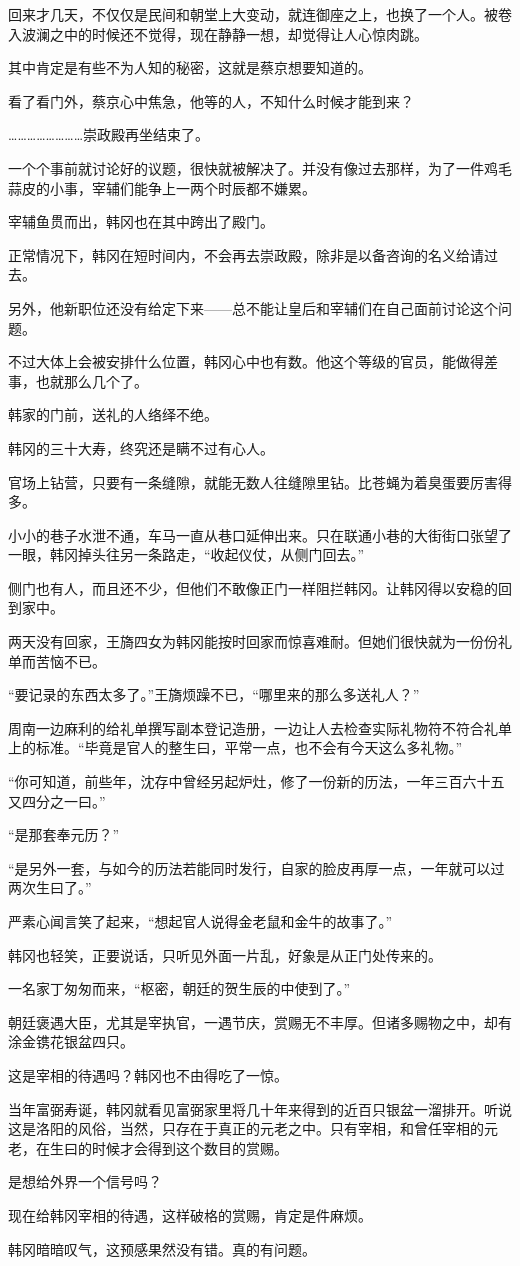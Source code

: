 回来才几天，不仅仅是民间和朝堂上大变动，就连御座之上，也换了一个人。被卷入波澜之中的时候还不觉得，现在静静一想，却觉得让人心惊肉跳。

其中肯定是有些不为人知的秘密，这就是蔡京想要知道的。

看了看门外，蔡京心中焦急，他等的人，不知什么时候才能到来？

……………………崇政殿再坐结束了。

一个个事前就讨论好的议题，很快就被解决了。并没有像过去那样，为了一件鸡毛蒜皮的小事，宰辅们能争上一两个时辰都不嫌累。

宰辅鱼贯而出，韩冈也在其中跨出了殿门。

正常情况下，韩冈在短时间内，不会再去崇政殿，除非是以备咨询的名义给请过去。

另外，他新职位还没有给定下来——总不能让皇后和宰辅们在自己面前讨论这个问题。

不过大体上会被安排什么位置，韩冈心中也有数。他这个等级的官员，能做得差事，也就那么几个了。

韩家的门前，送礼的人络绎不绝。

韩冈的三十大寿，终究还是瞒不过有心人。

官场上钻营，只要有一条缝隙，就能无数人往缝隙里钻。比苍蝇为着臭蛋要厉害得多。

小小的巷子水泄不通，车马一直从巷口延伸出来。只在联通小巷的大街街口张望了一眼，韩冈掉头往另一条路走，“收起仪仗，从侧门回去。”

侧门也有人，而且还不少，但他们不敢像正门一样阻拦韩冈。让韩冈得以安稳的回到家中。

两天没有回家，王旖四女为韩冈能按时回家而惊喜难耐。但她们很快就为一份份礼单而苦恼不已。

“要记录的东西太多了。”王旖烦躁不已，“哪里来的那么多送礼人？”

周南一边麻利的给礼单撰写副本登记造册，一边让人去检查实际礼物符不符合礼单上的标准。“毕竟是官人的整生曰，平常一点，也不会有今天这么多礼物。”

“你可知道，前些年，沈存中曾经另起炉灶，修了一份新的历法，一年三百六十五又四分之一曰。”

“是那套奉元历？”

“是另外一套，与如今的历法若能同时发行，自家的脸皮再厚一点，一年就可以过两次生曰了。”

严素心闻言笑了起来，“想起官人说得金老鼠和金牛的故事了。”

韩冈也轻笑，正要说话，只听见外面一片乱，好象是从正门处传来的。

一名家丁匆匆而来，“枢密，朝廷的贺生辰的中使到了。”

朝廷褒遇大臣，尤其是宰执官，一遇节庆，赏赐无不丰厚。但诸多赐物之中，却有涂金镌花银盆四只。

这是宰相的待遇吗？韩冈也不由得吃了一惊。

当年富弼寿诞，韩冈就看见富弼家里将几十年来得到的近百只银盆一溜排开。听说这是洛阳的风俗，当然，只存在于真正的元老之中。只有宰相，和曾任宰相的元老，在生曰的时候才会得到这个数目的赏赐。

是想给外界一个信号吗？

现在给韩冈宰相的待遇，这样破格的赏赐，肯定是件麻烦。

韩冈暗暗叹气，这预感果然没有错。真的有问题。

